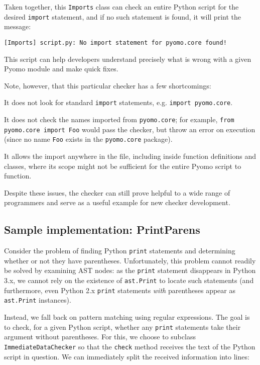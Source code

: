 \documentclass{article}
\begin{document}
Taken together, this \verb!Imports! class can check an entire Python script for the desired \verb!import! statement, and if no such statement is found, it will print the message:

\begin{verbatim}
[Imports] script.py: No import statement for pyomo.core found!
\end{verbatim}

This script can help developers understand precisely what is wrong with a given Pyomo module and make quick fixes.

Note, however, that this particular checker has a few shortcomings:

\begin{enumerate*}
\item It does not look for standard \verb!import! statements, e.g. \verb!import pyomo.core!.
\item It does not check the names imported from \verb!pyomo.core!; for example, \verb!from pyomo.core import Foo! would pass the checker, but throw an error on execution (since no name \verb!Foo! exists in the \verb!pyomo.core! package).
\item It allows the import anywhere in the file, including inside function definitions and classes, where its scope might not be sufficient for the entire Pyomo script to function.
\end{enumerate*}

Despite these issues, the checker can still prove helpful to a wide range of programmers and serve as a useful example for new checker development.

\subsection*{Sample implementation: PrintParens}
Consider the problem of finding Python \verb!print! statements and determining whether or not they have parentheses. Unfortunately, this problem cannot readily be solved by examining AST nodes: as the \verb!print! statement disappears in Python 3.x, we cannot rely on the existence of \verb!ast.Print! to locate such statements (and furthermore, even Python 2.x \verb!print! statements \textit{with} parentheses appear as \verb!ast.Print! instances).

Instead, we fall back on pattern matching using regular expressions. The goal is to check, for a given Python script, whether any \verb!print! statements take their argument without parentheses. For this, we choose to subclass \verb!ImmediateDataChecker! so that the \verb!check! method receives the text of the Python script in question. We can immediately split the received information into lines:
\end{document}
